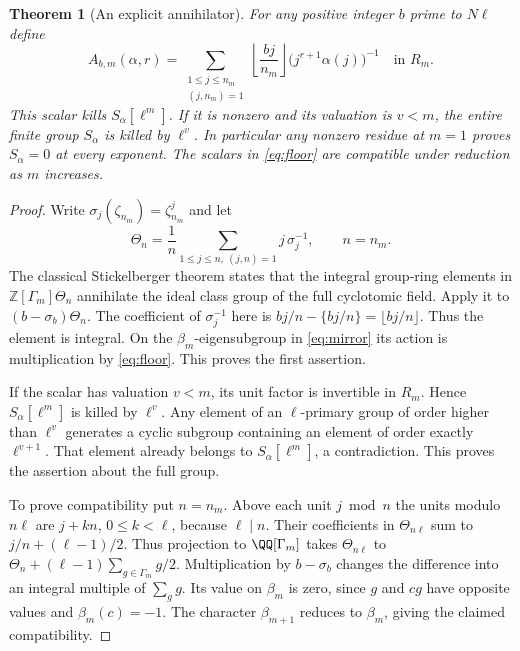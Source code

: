 \documentclass[a4paper,11pt]{article}
\newtheorem{theorem}[proposition]{Theorem}
\theoremstyle{definition}
\theoremstyle{remark}
\newcommand{\ZZ}{\mathbb Z}\newcommand{\ord}{\operatorname{ord}}
\numberwithin{equation}{section}
\begin{document}
\begin{theorem}[An explicit annihilator]\label{thm:stick}
For any positive integer \(b\) prime to \(N\ell\) define
\begin{equation}
 A_{b,m}(\alpha,r)=
   \sum_{\substack{1\le j\le n_m\\(j,n_m)=1}}
       \left\lfloor\frac{bj}{n_m}\right\rfloor
          \big(j^{r+1}\alpha(j)\big)^{-1}\quad\text{in }R_m .
 \label{eq:floor}
\end{equation}
This scalar kills \(S_\alpha[\ell^m]\). If it is nonzero and its valuation is \(v<m\), the entire finite group \(S_\alpha\) is killed by \(\ell^v\). In particular any nonzero residue at \(m=1\) proves \(S_\alpha=0\) at every exponent. The scalars in \eqref{eq:floor} are compatible under reduction as \(m\) increases.
\end{theorem}
\begin{proof}
Write \(\sigma_j(\zeta_{n_m})=\zeta_{n_m}^j\) and let
\[
   \Theta_n=\frac1n\sum_{1\le j\le n,\ (j,n)=1}j\,\sigma_j^{-1},
             \qquad n=n_m .
\]
The classical Stickelberger theorem states that the integral group-ring elements in \(\ZZ[\Gamma_m]\Theta_n\) annihilate the ideal class group of the full cyclotomic field. Apply it to \((b-\sigma_b)\Theta_n\). The coefficient of \(\sigma_j^{-1}\) here is \(bj/n-\{bj/n\}=\lfloor bj/n\rfloor\). Thus the element is integral. On the \(\beta_m\)-eigensubgroup in \eqref{eq:mirror} its action is multiplication by \eqref{eq:floor}. This proves the first assertion.~\cite{V-III-V-stick}

If the scalar has valuation \(v<m\), its unit factor is invertible in \(R_m\). Hence \(S_\alpha[\ell^m]\) is killed by \(\ell^v\). Any element of an \(\ell\)-primary group of order higher than \(\ell^v\) generates a cyclic subgroup containing an element of order exactly \(\ell^{v+1}\). That element already belongs to \(S_\alpha[\ell^m]\), a contradiction. This proves the assertion about the full group.

To prove compatibility put \(n=n_m\). Above each unit \(j\bmod n\) the units modulo \(n\ell\) are \(j+kn\), \(0\le k<\ell\), because \(\ell\mid n\). Their coefficients in \(\Theta_{n\ell}\) sum to \(j/n+(\ell-1)/2\). Thus projection to \(\QQ[\Gamma_m]\) takes \(\Theta_{n\ell}\) to \(\Theta_n+(\ell-1)\sum_{g\in\Gamma_m}g/2\). Multiplication by \(b-\sigma_b\) changes the difference into an integral multiple of \(\sum_g g\). Its value on \(\beta_m\) is zero, since \(g\) and \(cg\) have opposite values and \(\beta_m(c)=-1\). The character \(\beta_{m+1}\) reduces to \(\beta_m\), giving the claimed compatibility.
\end{proof}
\end{document}
